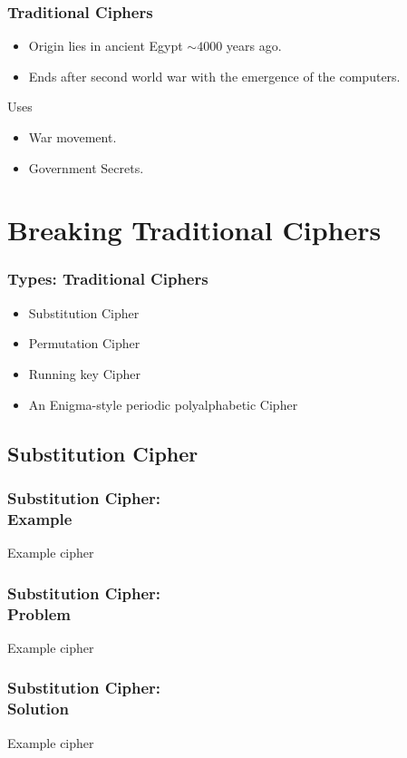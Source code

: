 \documentclass{uva-inf-presentation}
\begin{document}
\begin{frame}
\frametitle{Traditional Ciphers}
\begin{itemize}
    \item Origin lies in ancient Egypt $\sim4000$ years ago. %
    \item Ends after second world war with the emergence of the computers.
\end{itemize}
Uses
\begin{itemize}
    \item War movement.
    \item Government Secrets.
\end{itemize}
\end{frame}

\section{Breaking Traditional Ciphers}

\begin{frame}
\frametitle{Types: Traditional Ciphers}
\begin{itemize}
    \item Substitution Cipher
    \item Permutation Cipher
    \item Running key Cipher
    \item An Enigma-style periodic polyalphabetic Cipher
\end{itemize}
\end{frame}

\subsection{Substitution Cipher}

\begin{frame}
\frametitle{Substitution Cipher:\\ Example}
Example cipher
\end{frame}

\begin{frame}
\frametitle{Substitution Cipher:\\ Problem}
Example cipher
\end{frame}

\begin{frame}
\frametitle{Substitution Cipher:\\ Solution}
Example cipher
\end{frame}


\end{document}
